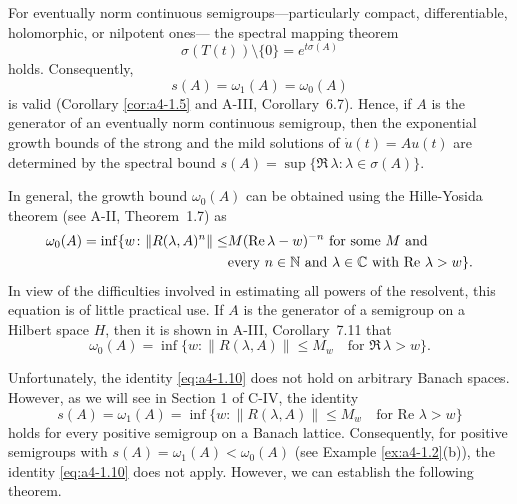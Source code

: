 \begin{remark}\label{rem:a4-1.7}
For eventually norm continuous semigroups---particularly compact, differentiable, holomorphic, or nilpotent ones--- the spectral mapping theorem 
\begin{equation}\label{eq:a4-1.7}
\sigma(T(t)) \setminus \{0\} = e^{t \sigma(A)}
\end{equation}
holds. 
Consequently,
\begin{equation}\label{eq:a4-1.8}
s(A) = \omega_1(A) = \omega_0(A)
\end{equation}
is valid (Corollary \ref{cor:a4-1.5} and A-III, Corollary~6.7).
Hence, if $A$ is the generator of an eventually norm continuous semigroup, then the exponential growth bounds of the strong and the mild solutions of $\dot{u}(t) = A u(t)$ are determined by the spectral bound
$s(A) = \sup\{\Re\,\lambda\colon\lambda \in \sigma(A)\}.$
\end{remark}
\begin{remark} In general, the growth bound $\omega_0(A)$ can be obtained using the Hille-Yosida theorem (see A-II, Theorem~1.7) as
\begin{align}\label{eq:a4-1.9}
\omega_0(A) = \inf \{ w\colon\|R(\lambda, A)^n\| \leq &M ( \Re\,\lambda - w)^{-n} \text{ for some } M \text{ and}\\
&\text{every } n \in \mathbb{N} \text{ and } \lambda \in \mathbb{C} \text{ with } \text{Re } \lambda > w\}.\notag
\end{align}
 In view of the difficulties involved in estimating all powers of the resolvent, this equation is of little practical use. 
If $A$ is the generator of a semigroup on a Hilbert space $H$, then it is shown in A-III, Corollary~7.11 that
\begin{equation}\label{eq:a4-1.10}
 \omega_0(A) = \inf \{ w\colon\| R(\lambda, A) \| \leq M_w \quad \text{for } \Re\,\lambda > w \}.
\end{equation}
\end{remark}
 Unfortunately, the identity \eqref{eq:a4-1.10} does not hold on arbitrary Banach spaces. 
However, as we will see in Section 1 of C-IV, the identity 
\begin{equation}\label{eq:a4-1.11}
 s(A)=\omega_1(A) = \inf \{ w\colon\| R(\lambda, A) \| \leq M_w \quad \text{for } \text{Re } \lambda > w \}
\end{equation}
 holds for every positive semigroup on a Banach lattice. 
Consequently, for positive semigroups with $s(A) = \omega_1(A) < \omega_0(A)$ (see Example \ref{ex:a4-1.2}(b)), the identity \eqref{eq:a4-1.10} does not apply. 
However, we can establish the following theorem.

